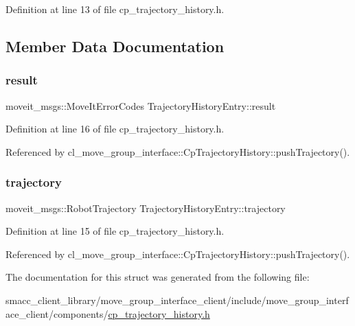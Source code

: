 Definition at line 13 of file cp\+\_\+trajectory\+\_\+history.\+h.



\subsection{Member Data Documentation}
\mbox{\label{structTrajectoryHistoryEntry_a64778e06b3e8d83cbf61909c6eb9b561}} 
\subsubsection{\texorpdfstring{result}{result}}
{\footnotesize\ttfamily moveit\+\_\+msgs\+::\+Move\+It\+Error\+Codes Trajectory\+History\+Entry\+::result}



Definition at line 16 of file cp\+\_\+trajectory\+\_\+history.\+h.



Referenced by cl\+\_\+move\+\_\+group\+\_\+interface\+::\+Cp\+Trajectory\+History\+::push\+Trajectory().

\mbox{\label{structTrajectoryHistoryEntry_a96ea80c78bed18a8688936d70281b796}} 
\subsubsection{\texorpdfstring{trajectory}{trajectory}}
{\footnotesize\ttfamily moveit\+\_\+msgs\+::\+Robot\+Trajectory Trajectory\+History\+Entry\+::trajectory}



Definition at line 15 of file cp\+\_\+trajectory\+\_\+history.\+h.



Referenced by cl\+\_\+move\+\_\+group\+\_\+interface\+::\+Cp\+Trajectory\+History\+::push\+Trajectory().



The documentation for this struct was generated from the following file\+:\begin{DoxyCompactItemize}
\item 
smacc\+\_\+client\+\_\+library/move\+\_\+group\+\_\+interface\+\_\+client/include/move\+\_\+group\+\_\+interface\+\_\+client/components/\hyperlink{cp__trajectory__history_8h}{cp\+\_\+trajectory\+\_\+history.\+h}\end{DoxyCompactItemize}
